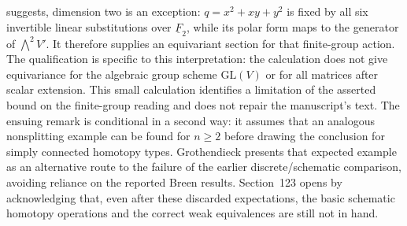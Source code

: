 \documentclass[10pt,oneside]{book}
\begin{document}
suggests, dimension two is an exception: $q=x^2+xy+y^2$ is fixed by all six invertible linear substitutions over $\underline F_2$, while its polar form maps to the generator of $\bigwedge^2V'$. It therefore supplies an equivariant section for that finite-group action. The qualification is specific to this interpretation: the calculation does not give equivariance for the algebraic group scheme $\mathrm{GL}(V)$ or for all matrices after scalar extension. This small calculation identifies a limitation of the asserted bound on the finite-group reading and does not repair the manuscript's text. The ensuing remark is conditional in a second way: it assumes that an analogous nonsplitting example can be found for $n\geq2$ before drawing the conclusion for simply connected homotopy types. Grothendieck presents that expected example as an alternative route to the failure of the earlier discrete/schematic comparison, avoiding reliance on the reported Breen results. Section~123 opens by acknowledging that, even after these discarded expectations, the basic schematic homotopy operations and the correct weak equivalences are still not in hand.
\end{document}
